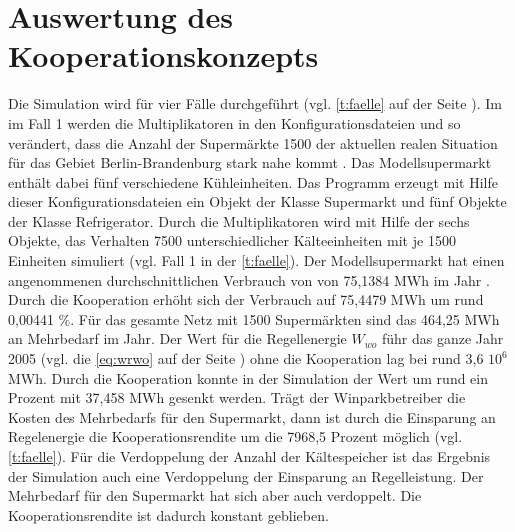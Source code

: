 \section{Auswertung des Kooperationskonzepts}
Die Simulation wird f\"ur vier F\"alle durchgef\"uhrt (vgl. \cref{t:faelle} auf
der Seite \pageref{t:faelle}). Im im Fall 1 werden die Multiplikatoren in den
Konfigurationsdateien  und  so ver\"andert, dass
die Anzahl der Superm\"arkte 1500 der aktuellen realen Situation f\"ur das
Gebiet Berlin-Brandenburg stark nahe kommt \cite{caro}. Das Modellsupermarkt
enth\"alt dabei f\"unf verschiedene K\"uhleinheiten. Das Programm erzeugt mit
Hilfe dieser Konfigurationsdateien ein Objekt der Klasse Supermarkt und f\"unf
Objekte der Klasse Refrigerator. Durch die Multiplikatoren wird mit Hilfe der
sechs Objekte, das Verhalten 7500 unterschiedlicher K\"alteeinheiten mit je 1500
Einheiten simuliert (vgl. Fall 1 in der \cref{t:faelle}). Der Modellsupermarkt
hat einen angenommenen durchschnittlichen Verbrauch von von 75,1384 MWh im Jahr
\cite{caro}. Durch die Kooperation erh\"oht sich der Verbrauch auf 75,4479 MWh
um rund 0,00441 $\%$.  F\"ur das gesamte Netz mit 1500 Superm\"arkten sind das
464,25 MWh an Mehrbedarf im Jahr. Der Wert f\"ur die Regellenergie $W_{wo}$
f\"uhr das ganze Jahr 2005 (vgl. die \cref{eq:wrwo} auf der Seite
\pageref{eq:wrwo}) ohne die Kooperation lag bei rund 3,6 $10^6$ MWh. Durch die
Kooperation konnte in der Simulation der Wert um rund ein Prozent mit 37,458 MWh
gesenkt werden. Tr\"agt der Winparkbetreiber die Kosten des Mehrbedarfs
f\"ur den Supermarkt, dann ist durch die Einsparung an Regelenergie die
Kooperationsrendite um die 7968,5 Prozent m\"oglich (vgl. \cref{t:faelle}).
F\"ur die Verdoppelung der Anzahl der K\"altespeicher ist das Ergebnis der
Simulation auch eine Verdoppelung der Einsparung an Regelleistung. Der
Mehrbedarf f\"ur den Supermarkt hat sich aber auch verdoppelt. Die
Kooperationsrendite ist dadurch konstant geblieben.


